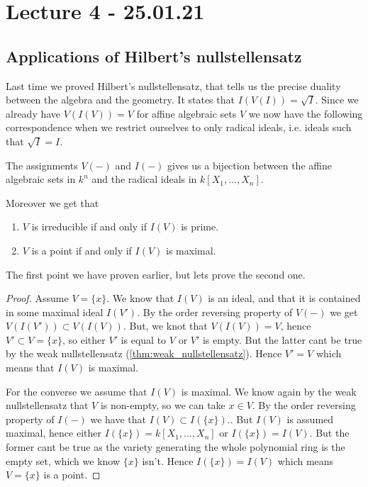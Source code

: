 \section{Lecture 4 - 25.01.21}

\subsection{Applications of Hilbert's nullstellensatz}

Last time we proved Hilbert's nullstellensatz, that tells us the precise duality between the algebra and the geometry. It states that $I(V(I))=\sqrt{I}$. Since we already have $V(I(V))=V$ for affine algebraic sets $V$ we now have the following correspondence when we restrict ourselves to only radical ideals, i.e. ideals such that $\sqrt{I}=I$. 

\begin{proposition}
The assignments $V(-)$ and $I(-)$ gives us a bijection between the affine algebraic sets in $k^n$ and the radical ideals in $k[X_1, \ldots, X_n]$. 
\end{proposition}

Moreover we get that 
\begin{enumerate}
    \item $V$ is irreducible if and only if $I(V)$ is prime.
    \item $V$ is a point if and only if $I(V)$ is maximal.
\end{enumerate} 
The first point we have proven earlier, but lets prove the second one.
\begin{proof}
Assume $V=\{x\}$. We know that $I(V)$ is an ideal, and that it is contained in some maximal ideal $I(V')$. By the order reversing property of $V(-)$ we get $V(I(V'))\subset V(I(V))$. But, we knot that $V(I(V))=V$, hence $V'\subset V = \{x\}$, so either $V'$ is equal to $V$ or $V'$ is empty. But the latter cant be true by the weak nullstellensatz (\cref{thm:weak_nullstellensatz}). Hence $V'=V$ which means that $I(V)$ is maximal. 

For the converse we assume that $I(V)$ is maximal. We know again by the weak nullstellensatz that $V$ is non-empty, so we can take $x\in V$. By the order reversing property of $I(-)$ we have that $I(V)\subset I(\{x\})$.. But $I(V)$ is assumed maximal, hence either $I(\{x\})=k[X_1, \ldots, X_n]$ or $I(\{x\})=I(V)$. But the former cant be true as the variety generating the whole polynomial ring is the empty set, which we know $\{x\}$ isn't. Hence $I(\{x\})=I(V)$ which means $V=\{x\}$ is a point. 
\end{proof}


